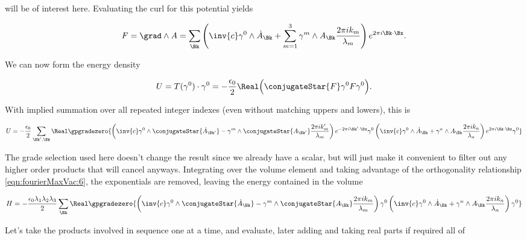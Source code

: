 will be of interest here.  Evaluating the curl for this potential yields

\begin{align}\label{eqn:fourierMaxVac:8}
F = \grad \wedge A
= \sum_{\Bk} \left( \inv{c} \gamma^0 \wedge \dot{A}_\Bk + \sum_{m=1}^3 \gamma^m \wedge A_\Bk \frac{2 \pi i k_m}{\lambda_m} \right) e^{2 \pi i \Bk \cdot \Bx}.
\end{align}

We can now form the energy density

\begin{align}\label{eqn:fourierMaxVac:9}
U = T(\gamma^0) \cdot \gamma^0
=
-\frac{\epsilon_0}{2} \Real \Bigl( \conjugateStar{F} \gamma^0 F \gamma^0 \Bigr).
\end{align}

With implied summation over all repeated integer indexes (even without matching uppers and lowers), this is

\begin{align}\label{eqn:fourierMaxVac:10}
U =
-\frac{\epsilon_0}{2} \sum_{\Bk', \Bk} \Real \gpgradezero{
\left( \inv{c} \gamma^0 \wedge \conjugateStar{\dot{A}_{\Bk'}} - \gamma^m \wedge \conjugateStar{A_{\Bk'}} \frac{2 \pi i k_m'}{\lambda_m} \right) e^{-2 \pi i \Bk' \cdot \Bx}
\gamma^0
\left( \inv{c} \gamma^0 \wedge \dot{A}_\Bk + \gamma^n \wedge A_\Bk \frac{2 \pi i k_n}{\lambda_n} \right) e^{2 \pi i \Bk \cdot \Bx}
\gamma^0
}
\end{align}

The grade selection used here doesn't change the result since we already have a scalar, but will just make it convenient to filter out any higher order products that will cancel anyways.  Integrating over the volume element and taking advantage of the orthogonality relationship \ref{eqn:fourierMaxVac:6}, the exponentials are removed, leaving the energy contained in the volume

\begin{align}\label{eqn:fourierMaxVac:11}
H = %
-\frac{\epsilon_0 \lambda_1 \lambda_2 \lambda_3}{2}
\sum_{\Bk} \Real 
\gpgradezero{
\left( \inv{c} \gamma^0 \wedge \conjugateStar{\dot{A}_{\Bk}} - \gamma^m \wedge \conjugateStar{A_{\Bk}} \frac{2 \pi i k_m}{\lambda_m} \right) 
\gamma^0
\left( \inv{c} \gamma^0 \wedge \dot{A}_\Bk + \gamma^n \wedge A_\Bk \frac{2 \pi i k_n}{\lambda_n} \right) 
\gamma^0
}
\end{align}

Let's take the products involved in sequence one at a time, and evaluate, later adding and taking real parts if required all of

